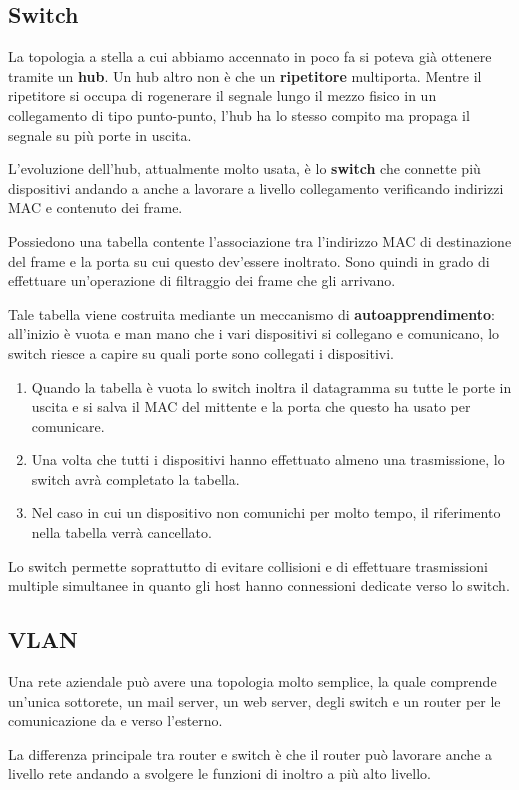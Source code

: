 \subsection{Switch}
La topologia a stella a cui abbiamo accennato in poco fa si poteva
già ottenere tramite un \textbf{hub}. Un hub altro non è che un 
\textbf{ripetitore} multiporta. Mentre il ripetitore si occupa di 
rogenerare il segnale lungo il mezzo fisico in un collegamento di tipo
punto-punto, l'hub ha lo stesso compito ma propaga il segnale su più
porte in uscita.

L'evoluzione dell'hub, attualmente molto usata, è lo \textbf{switch}
che connette più dispositivi andando a anche a lavorare a livello 
collegamento verificando indirizzi MAC e contenuto dei frame.

Possiedono una tabella contente l'associazione tra l'indirizzo MAC di
destinazione del frame e la porta su cui questo dev'essere inoltrato.
Sono quindi in grado di effettuare un'operazione di filtraggio dei 
frame che gli arrivano.

Tale tabella viene costruita mediante un meccanismo di 
\textbf{autoapprendimento}: all'inizio è vuota e man mano che i vari
dispositivi si collegano e comunicano, lo switch riesce a capire su
quali porte sono collegati i dispositivi.
\begin{enumerate}
	\item Quando la tabella è vuota lo switch inoltra il datagramma su
		tutte le porte in uscita e si salva il MAC del mittente e la
		porta che questo ha usato per comunicare.
	\item Una volta che tutti i dispositivi hanno effettuato almeno
		una trasmissione, lo switch avrà completato la tabella.
	\item Nel caso in cui un dispositivo non comunichi per molto 
		tempo, il riferimento nella tabella verrà cancellato.
\end{enumerate}
Lo switch permette soprattutto di evitare collisioni e di effettuare
trasmissioni multiple simultanee in quanto gli host hanno connessioni
dedicate verso lo switch.

\subsection{VLAN}
Una rete aziendale può avere una topologia molto semplice, la quale 
comprende un'unica sottorete, un mail server, un web server, degli 
switch e un router per le comunicazione da e verso l'esterno.

La differenza principale tra router e switch è che il router può 
lavorare anche a livello rete andando a svolgere le funzioni di inoltro
a più alto livello.


